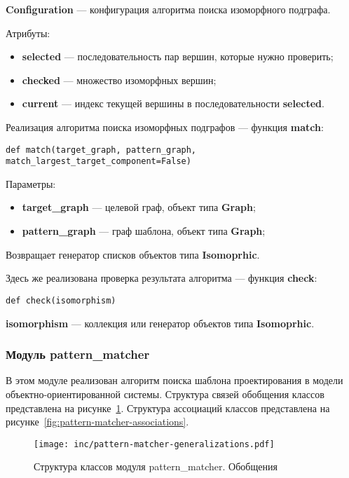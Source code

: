 \textbf{Configuration} --- конфигурация алгоритма поиска изоморфного подграфа.

Атрибуты:
\begin{itemize}
\item \textbf{selected} --- последовательность пар вершин, которые нужно проверить;
\item \textbf{checked} --- множество изоморфных вершин;
\item \textbf{current} --- индекс текущей вершины в последовательности \textbf{selected}.
\end{itemize}

Реализация алгоритма поиска изоморфных подграфов --- функция \textbf{match}:

\begin{verbatim}
def match(target_graph, pattern_graph, match_largest_target_component=False)
\end{verbatim}

Параметры:
\begin{itemize}
\item \textbf{target\_graph} --- целевой граф, объект типа \textbf{Graph};
\item \textbf{pattern\_graph} --- граф шаблона, объект типа \textbf{Graph};
\end{itemize}

Возвращает генератор списков объектов типа \textbf{Isomoprhic}.

Здесь же реализована проверка результата алгоритма --- функция \textbf{check}:

\begin{verbatim}
def check(isomorphism)
\end{verbatim}

\textbf{isomorphism} --- коллекция или генератор объектов типа \textbf{Isomoprhic}.

\subsubsection{Модуль pattern\_matcher}

В этом модуле реализован алгоритм поиска шаблона проектирования в модели
объектно-ориентированной системы.
Структура связей обобщения классов представлена на рисунке~\ref{fig:pattern-matcher-generalizations}.
Структура ассоциаций классов представлена на рисунке~\ref{fig:pattern-matcher-associations}.

\begin{figure}[!ht]
\centering
\texttt{[image: inc/pattern-matcher-generalizations.pdf]}
\caption{Структура классов модуля pattern\_matcher. Обобщения}
\label{fig:pattern-matcher-generalizations}
\end{figure}

